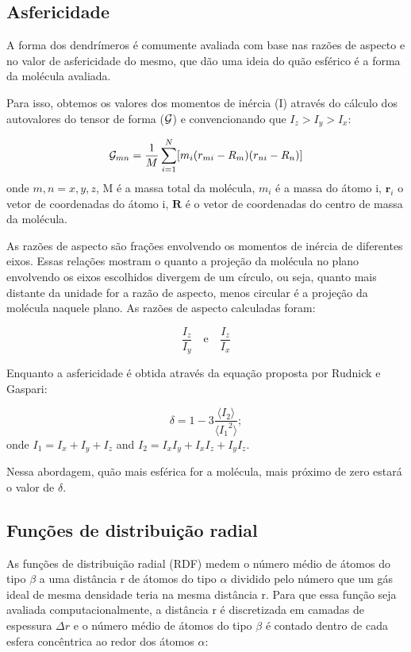 \subsection{Asfericidade}\label{Fator de forma}\label{Asfericidade}
A forma dos dendrímeros é comumente avaliada com base nas razões de aspecto e no valor de asfericidade do mesmo, que dão uma ideia do quão esférico é a forma da molécula avaliada.

Para isso, obtemos os valores dos momentos de inércia (I) através do cálculo dos autovalores do tensor de forma ($\mathcal{G}$) e convencionando que $I_z > I_y > I_x$: \cite{Rapaport2005}

\begin{equation}
 \mathcal{G}_{mn} = \frac{1}{M} \sum_{i=1}^{N} [{m_i}(r_{mi}-{R_m})(r_{ni}-{R_n})]
\end{equation}
onde $m,n = x,y,z$, M é a massa total da molécula, $m_i$ é a massa do átomo i, $\textbf{r}_i$ o vetor de coordenadas do átomo i, $\textbf{R}$ é o vetor de coordenadas do centro de massa da molécula.

As razões de aspecto são frações envolvendo os momentos de inércia de diferentes eixos.
Essas relações mostram o quanto a projeção da molécula no plano envolvendo os eixos escolhidos divergem de um círculo, ou seja, quanto mais distante da unidade for a razão de aspecto, menos circular é a projeção da molécula naquele plano.
As razões de aspecto calculadas foram:

\begin{equation}
\frac{I_z}{I_y} \quad \text{e} \quad \frac{I_z}{I_x}
\end{equation}

Enquanto a asfericidade é obtida através da equação proposta por Rudnick e Gaspari\cite{rudnick1986}:

\begin{equation}
\delta = 1 - 3\frac{\langle I_2 \rangle}{\langle {I_1}^2 \rangle};
\end{equation}
onde $I_1 = I_x + I_y + I_z$ and $I_2 = {I_x}{I_y}+{I_x}{I_z}+{I_y}{I_z}$.

Nessa abordagem, quão mais esférica for a molécula, mais próximo de zero estará o valor de $\delta$.

\subsection{Funções de distribuição radial}\label{RDF}
As funções de distribuição radial (RDF) medem o número médio de átomos do tipo $\beta$ a uma distância r de átomos do tipo $\alpha$ dividido pelo número que um gás ideal de mesma densidade teria na mesma distância r.\cite{Allen2017}
Para que essa função seja avaliada computacionalmente, a distância r é discretizada em camadas de espessura $\Delta r$ e o número médio de átomos do tipo $\beta$ é contado dentro de cada esfera concêntrica ao redor dos átomos $\alpha$\cite{Allen2017}:

